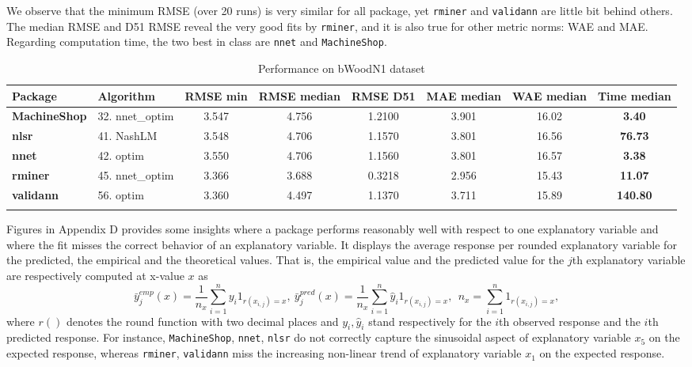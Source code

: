We observe that the minimum RMSE (over 20 runs) is very similar for all
package, yet \texttt{rminer} and \texttt{validann} are little bit behind
others. The median RMSE and D51 RMSE reveal the very good fits by
\texttt{rminer}, and it is also true for other metric norms: WAE and
MAE. Regarding computation time, the two best in class are \texttt{nnet}
and \texttt{MachineShop}.

\begin{Schunk}
\begin{table}

\caption{\label{tab:unnamed-chunk-5}Performance on bWoodN1 dataset}
\centering
\fontsize{7}{9}\selectfont
\begin{tabular}[t]{>{\bfseries}llccccc>{\bfseries}c}
\toprule
Package & Algorithm & RMSE min & RMSE median & RMSE D51 & MAE median & WAE median & Time median\\
\midrule
MachineShop & 32. nnet\_optim & 3.547 & 4.756 & 1.2100 & 3.901 & 16.02 & 3.40\\
nlsr & 41. NashLM & 3.548 & 4.706 & 1.1570 & 3.801 & 16.56 & 76.73\\
nnet & 42. optim & 3.550 & 4.706 & 1.1560 & 3.801 & 16.57 & 3.38\\
rminer & 45. nnet\_optim & 3.366 & 3.688 & 0.3218 & 2.956 & 15.43 & 11.07\\
validann & 56. optim & 3.360 & 4.497 & 1.1370 & 3.711 & 15.89 & 140.80\\
\bottomrule
\multicolumn{8}{l}{\textit{Note: } statistics taken over 20 runs; time in seconds.}\\
\end{tabular}
\end{table}

\end{Schunk}

Figures in Appendix D provides some insights where a package performs
reasonably well with respect to one explanatory variable and where the
fit misses the correct behavior of an explanatory variable. It displays
the average response per rounded explanatory variable for the predicted,
the empirical and the theoretical values. That is, the empirical value
and the predicted value for the \(j\)th explanatory variable are
respectively computed at x-value \(x\) as \[
\bar y^{emp}_j(x) = \frac1{n_x}  \sum_{i=1}^n y_i 1_{r(x_{i,j}) = x},~
\bar y^{pred}_j(x) =  \frac1{n_x} \sum_{i=1}^n \hat y_i 1_{r(x_{i,j}) = x},~~
n_x=\sum_{i=1}^n 1_{r(x_{i,j}) = x},
\] where \(r()\) denotes the round function with two decimal places and
\(y_i, \hat y_i\) stand respectively for the \(i\)th observed response
and the \(i\)th predicted response. For instance, \texttt{MachineShop},
\texttt{nnet}, \texttt{nlsr} do not correctly capture the sinusoidal
aspect of explanatory variable \(x_5\) on the expected response, whereas
\texttt{rminer}, \texttt{validann} miss the increasing non-linear trend
of explanatory variable \(x_1\) on the expected response.

